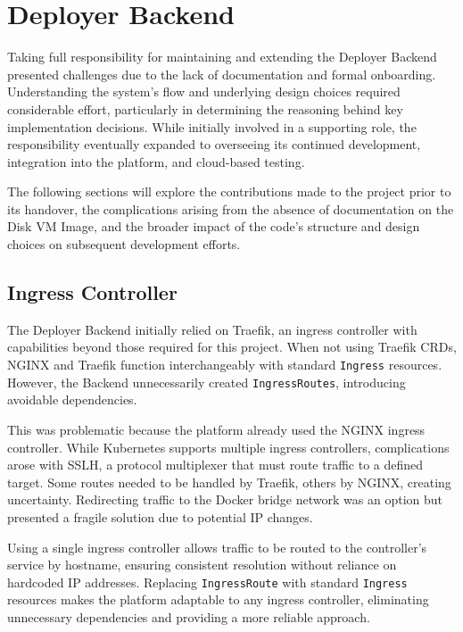 \section{Deployer Backend}\label{sec:deployer_backend}
Taking full responsibility for maintaining and extending the Deployer Backend presented challenges due to the lack of documentation and formal onboarding. Understanding the system's flow and underlying design choices required considerable effort, particularly in determining the reasoning behind key implementation decisions. While initially involved in a supporting role, the responsibility eventually expanded to overseeing its continued development, integration into the platform, and cloud-based testing.

The following sections will explore the contributions made to the project prior to its handover, the complications arising from the absence of documentation on the Disk VM Image, and the broader impact of the code's structure and design choices on subsequent development efforts.

\subsection{Ingress Controller}
The Deployer Backend initially relied on Traefik, an ingress controller with capabilities beyond those required for this project. When not using Traefik CRDs, NGINX and Traefik function interchangeably with standard \texttt{Ingress} resources. However, the Backend unnecessarily created \texttt{IngressRoutes}, introducing avoidable dependencies.

This was problematic because the platform already used the NGINX ingress controller. While Kubernetes supports multiple ingress controllers, complications arose with SSLH, a protocol multiplexer that must route traffic to a defined target. Some routes needed to be handled by Traefik, others by NGINX, creating uncertainty. Redirecting traffic to the Docker bridge network was an option but presented a fragile solution due to potential IP changes.

Using a single ingress controller allows traffic to be routed to the controller's service by hostname, ensuring consistent resolution without reliance on hardcoded IP addresses. Replacing \texttt{IngressRoute} with standard \texttt{Ingress} resources makes the platform adaptable to any ingress controller, eliminating unnecessary dependencies and providing a more reliable approach.

